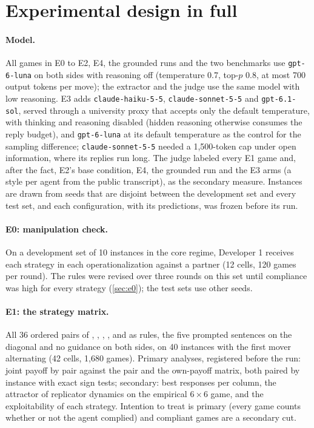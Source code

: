 \section{Experimental design in full}
\label{app:design}

\paragraph{Model.} All games in E0 to E2, E4, the grounded runs and the two benchmarks use \texttt{gpt-6-luna} on both sides with reasoning off (temperature 0.7, top-$p$ 0.8, at most 700 output tokens per move); the extractor and the judge use the same model with low reasoning. E3 adds \texttt{claude-haiku-5-5}, \texttt{claude-sonnet-5-5} and \texttt{gpt-6.1-sol}, served through a university proxy that accepts only the default temperature, with thinking and reasoning disabled (hidden reasoning otherwise consumes the reply budget), and \texttt{gpt-6-luna} at its default temperature as the control for the sampling difference; \texttt{claude-sonnet-5-5} needed a 1{,}500-token cap under open information, where its replies run long. The judge labeled every E1 game and, after the fact, E2's base condition, E4, the grounded run and the E3 arms (a style per agent from the public transcript), as the secondary measure. Instances are drawn from seeds that are disjoint between the development set and every test set, and each configuration, with its predictions, was frozen before its run.

\paragraph{E0: manipulation check.} On a development set of 10 instances in the core regime, Developer 1 receives each strategy in each operationalization against a \neutral{} partner (12 cells, 120 games per round). The rules were revised over three rounds on this set until compliance was high for every strategy (\cref{sec:e0}); the test sets use other seeds.

\paragraph{E1: the strategy matrix.} All 36 ordered pairs of \neutral, \competing, \collaborating, \compromising, \accommodating{} and \avoiding{} as rules, the five prompted sentences on the diagonal and no guidance on both sides, on 40 instances with the first mover alternating (42 cells, 1{,}680 games). Primary analyses, registered before the run: joint payoff by pair against the \neutral{} pair and the own-payoff matrix, both paired by instance with exact sign tests; secondary: best responses per column, the attractor of replicator dynamics on the empirical $6\times6$ game, and the exploitability of each strategy. Intention to treat is primary (every game counts whether or not the agent complied) and compliant games are a secondary cut.

